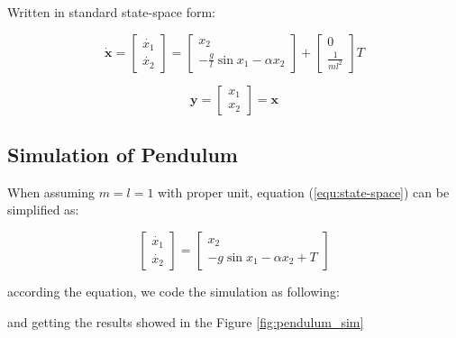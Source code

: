 \documentclass[titlepage]{article}
\begin{document}
Written in standard state-space form:

\begin{equation}
    \bm{\dot{x}} = 
    \begin{bmatrix}
        \dot{x_1} \\ \dot{x_2}
    \end{bmatrix}
    =
    \begin{bmatrix}
        x_2 \\ -\frac{g}{l}\sin{x_1} - \alpha x_2
    \end{bmatrix}
    +
    \begin{bmatrix}
        0 \\ \frac{1}{ml^2}
    \end{bmatrix}
    T
    \label{equ:state-space}
\end{equation}

\begin{equation}
    \bm{y} = 
    \begin{bmatrix}
        x_1 \\ x_2
    \end{bmatrix}
    = \bm{x}
\end{equation}

\subsection{Simulation of Pendulum}

When assuming $m=l=1$ with proper unit, equation (\ref{equ:state-space}) can be simplified as:

\begin{equation}
    \begin{bmatrix}
        \dot{x_1} \\ \dot{x_2}
    \end{bmatrix}
    =
    \begin{bmatrix}
        x_2 \\ -g\sin{x_1} - \alpha x_2 + T
    \end{bmatrix}
\end{equation}

according the equation, we code the simulation as following:



and getting the results showed in the Figure \ref{fig:pendulum_sim}
\end{document}
